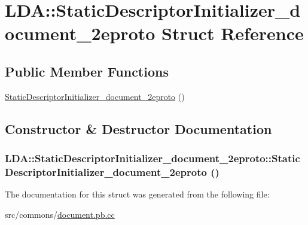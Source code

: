 \hypertarget{struct_l_d_a_1_1_static_descriptor_initializer__document__2eproto}{
\section{LDA::StaticDescriptorInitializer\_\-document\_\-2eproto Struct Reference}
\label{struct_l_d_a_1_1_static_descriptor_initializer__document__2eproto}
}
\subsection*{Public Member Functions}
\begin{DoxyCompactItemize}
\item 
\hyperlink{struct_l_d_a_1_1_static_descriptor_initializer__document__2eproto_aaa2e77af1083929ff67b018bd9458878}{StaticDescriptorInitializer\_\-document\_\-2eproto} ()
\end{DoxyCompactItemize}


\subsection{Constructor \& Destructor Documentation}
\hypertarget{struct_l_d_a_1_1_static_descriptor_initializer__document__2eproto_aaa2e77af1083929ff67b018bd9458878}{
\subsubsection[{StaticDescriptorInitializer\_\-document\_\-2eproto}]{\setlength{\rightskip}{0pt plus 5cm}LDA::StaticDescriptorInitializer\_\-document\_\-2eproto::StaticDescriptorInitializer\_\-document\_\-2eproto ()}}
\label{struct_l_d_a_1_1_static_descriptor_initializer__document__2eproto_aaa2e77af1083929ff67b018bd9458878}


The documentation for this struct was generated from the following file:\begin{DoxyCompactItemize}
\item 
src/commons/\hyperlink{document_8pb_8cc}{document.pb.cc}\end{DoxyCompactItemize}

